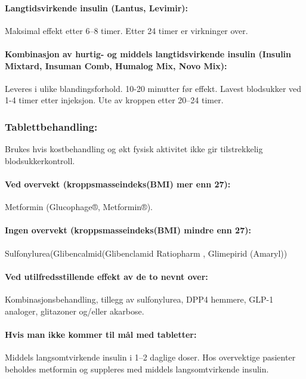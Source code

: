 					\paragraph{Langtidsvirkende insulin (Lantus\textregistered, Levimir\textregistered):\\}Maksimal effekt etter 6–8 timer. Etter 24 timer er virkninger over\cite{legevakthandboka}.

					\paragraph{Kombinasjon av hurtig- og middels langtidsvirkende insulin (Insulin Mixtard\textregistered, Insuman Comb\textregistered, Humalog Mix, Novo Mix):\\} Leveres i ulike blandingsforhold. 10-20 minutter før effekt. Lavest blodsukker ved 1-4 timer etter injeksjon. Ute av kroppen etter 20–24 timer\cite{legevakthandboka}.

				\subsubsection{Tablettbehandling:} 
					Brukes hvis kostbehandling og økt fysisk aktivitet ikke gir tilstrekkelig blodsukkerkontroll\cite{legevakthandboka}.

					\paragraph{Ved overvekt (kroppsmasseindeks(BMI) mer enn 27):\\}Metformin (Glucophage®, Metformin®).

					\paragraph{Ingen overvekt (kroppsmasseindeks(BMI) mindre enn 27):\\}Sulfonylurea(Glibencalmid(Glibenclamid Ratiopharm \textregistered, Glimepirid (Amaryl\textregistered))

					\paragraph{Ved utilfredsstillende effekt av de to nevnt over:\\}Kombinasjonsbehandling, tillegg av sulfonylurea, DPP4 hemmere, GLP-1 analoger, glitazoner og/eller akarbose.

					\paragraph{Hvis man ikke kommer til mål med tabletter:\\} Middels langsomtvirkende insulin i 1–2 daglige doser. Hos overvektige pasienter beholdes metformin og suppleres med middels langsomtvirkende insulin.

